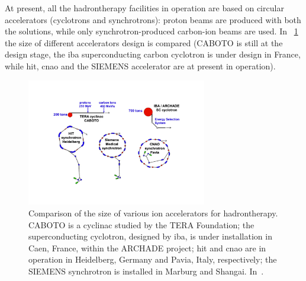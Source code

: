 At present, all the hadrontherapy facilities in operation are based on circular accelerators (cyclotrons and synchrotrons): proton beams are produced with both the solutions, while only synchrotron-produced carbon-ion beams are used. In \figurename~\ref{chap1::fig::acceleratorSize} the size of different accelerators design is compared (CABOTO is still at the design stage, the \gls{iba} superconducting carbon cyclotron is under design in France, while \gls{hit}, \gls{cnao} and the SIEMENS accelerator are at present in operation).

\begin{figure}[!htbp]
\centering
\includegraphics[width=0.7\textwidth]{03_GraphicFiles/chapter1_Introduction/acceleratorSize.pdf}
\caption{Comparison of the size of various ion accelerators for hadrontherapy. CABOTO is a cyclinac studied by the TERA Foundation; the superconducting cyclotron, designed by \gls{iba}, is under installation in Caen, France, within the ARCHADE project; \gls{hit} and \gls{cnao} are in operation in Heidelberg, Germany and Pavia, Italy, respectively; the SIEMENS synchrotron is installed in Marburg and Shangai. In~\cite{Amaldi2010}.}
\label{chap1::fig::acceleratorSize}
\end{figure} 

